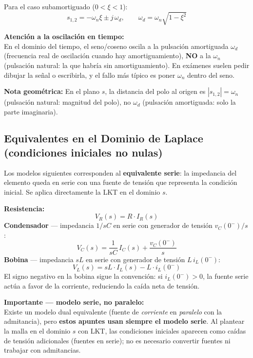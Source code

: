 \documentclass[12pt,a4paper]{article}
\begin{document}
Para el caso subamortiguado ($0 < \xi < 1$):
\[
  s_{1,2} = -\omega_n\xi \pm j\,\omega_d, \qquad \omega_d = \omega_n\sqrt{1-\xi^2}
\]

\begin{warnbox}
\textbf{\color{warnorangeline}Atención a la oscilación en tiempo:}\\[4pt]
En el dominio del tiempo, el seno/coseno oscila a la pulsación amortiguada $\omega_d$ (frecuencia real de oscilación cuando hay amortiguamiento),
\textbf{NO} a la $\omega_n$ (pulsación natural: la que habría sin amortiguamiento). En exámenes suelen pedir
dibujar la señal o escribirla, y el fallo más típico es poner $\omega_n$ dentro
del seno.
\end{warnbox}

\vspace{4pt}
\textbf{Nota geométrica:} En el plano $s$, la distancia del polo al origen es
$|s_{1,2}| = \omega_n$ (pulsación natural: magnitud del polo), no $\omega_d$ (pulsación amortiguada: solo la parte imaginaria).
\clearpage %
\subsection{Equivalentes en el Dominio de Laplace (condiciones iniciales no nulas)}

Los modelos siguientes corresponden al \textbf{equivalente serie}: la impedancia del
elemento queda en serie con una fuente de tensión que representa la condición inicial.
Se aplica directamente la LKT en el dominio $s$.

\begin{formulabox}
\textbf{Resistencia:}
\[
  V_R(s) = R\cdot I_R(s)
\]
\textbf{Condensador} — impedancia $1/sC$ en serie con generador de tensión $v_C(0^-)/s$:
\[
  V_C(s) = \frac{1}{sC}\,I_C(s) + \frac{v_C(0^-)}{s}
\]
\textbf{Bobina} — impedancia $sL$ en serie con generador de tensión $L\,i_L(0^-)$:
\[
  V_L(s) = sL\cdot I_L(s) - L\cdot i_L(0^-)
\]
El signo negativo en la bobina sigue la convención: si $i_L(0^-)>0$, la fuente
serie actúa a favor de la corriente, reduciendo la caída neta de tensión.
\end{formulabox}

\begin{warnbox}
\textbf{\color{warnorangeline}Importante — modelo serie, no paralelo:}\\[4pt]
Existe un modelo dual equivalente (fuente de \emph{corriente} en \emph{paralelo} con
la admitancia), pero \textbf{estos apuntes usan siempre el modelo serie}. Al plantear
la malla en el dominio $s$ con LKT, las condiciones iniciales aparecen como caídas
de tensión adicionales (fuentes en serie); no es necesario convertir fuentes ni
trabajar con admitancias.
\end{warnbox}
\clearpage %
\end{document}
